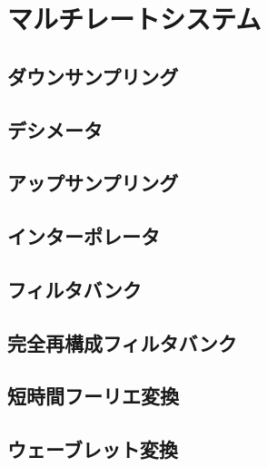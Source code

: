 \section{マルチレートシステム}

\subsection{ダウンサンプリング}

\subsection{デシメータ}

\subsection{アップサンプリング}

\subsection{インターポレータ}

\subsection{フィルタバンク}

\subsection{完全再構成フィルタバンク}

\subsection{短時間フーリエ変換}

\subsection{ウェーブレット変換}

